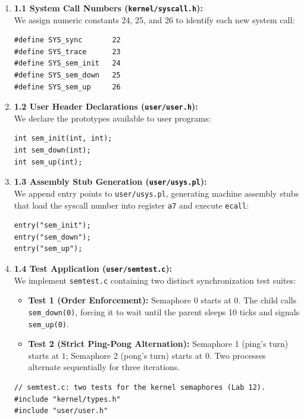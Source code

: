 \documentclass{labreport}
\begin{document}
\begin{enumerate}[leftmargin=*]
    \item \textbf{1.1 System Call Numbers (\texttt{kernel/syscall.h}):}\\
    We assign numeric constants 24, 25, and 26 to identify each new system call:
\begin{lstlisting}[style=c]
#define SYS_sync       22
#define SYS_trace      23
#define SYS_sem_init   24
#define SYS_sem_down   25
#define SYS_sem_up     26
\end{lstlisting}

    \item \textbf{1.2 User Header Declarations (\texttt{user/user.h}):}\\
    We declare the prototypes available to user programs:
\begin{lstlisting}[style=c]
int sem_init(int, int);
int sem_down(int);
int sem_up(int);
\end{lstlisting}

    \item \textbf{1.3 Assembly Stub Generation (\texttt{user/usys.pl}):}\\
    We append entry points to \texttt{user/usys.pl}, generating machine assembly stubs that load the syscall number into register \texttt{a7} and execute \texttt{ecall}:
\begin{lstlisting}[style=bash]
entry("sem_init");
entry("sem_down");
entry("sem_up");
\end{lstlisting}

    \item \textbf{1.4 Test Application (\texttt{user/semtest.c}):}\\
    We implement \texttt{semtest.c} containing two distinct synchronization test suites:
    \begin{itemize}[noitemsep]
        \item \textbf{Test 1 (Order Enforcement):} Semaphore 0 starts at $0$. The child calls \texttt{sem\_down(0)}, forcing it to wait until the parent sleeps 10 ticks and signals \texttt{sem\_up(0)}.
        \item \textbf{Test 2 (Strict Ping-Pong Alternation):} Semaphore 1 (ping's turn) starts at $1$; Semaphore 2 (pong's turn) starts at $0$. Two processes alternate sequentially for three iterations.
    \end{itemize}

\begin{lstlisting}[style=c]
// semtest.c: two tests for the kernel semaphores (Lab 12).
#include "kernel/types.h"
#include "user/user.h"


\end{lstlisting}
\end{enumerate}
\end{document}
